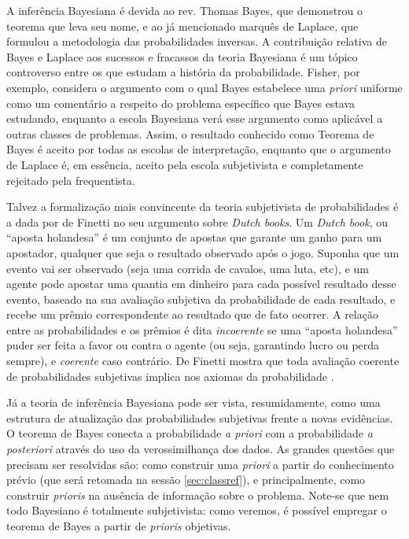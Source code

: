 A inferência Bayesiana é devida ao rev. Thomas Bayes, que demonstrou o teorema que leva seu nome, e ao já mencionado marquês de
Laplace, que formulou a metodologia das probabilidades inversas. A contribuição relativa de Bayes e Laplace aos sucessos
e fracassos da teoria Bayesiana é um tópico controverso	entre os que estudam a história da probabilidade\citep{Zabell09}.
Fisher, por exemplo, considera o argumento com o qual Bayes estabelece uma {\em priori} uniforme como um comentário
a respeito do problema específico que Bayes estava estudando, enquanto a escola Bayesiana verá esse argumento
como aplicável a outras classes de problemas\citep{Aldrich08}. Assim, o resultado conhecido como Teorema de Bayes é aceito
por todas as escolas de interpretação, enquanto que o argumento de Laplace 
é, em essência, aceito pela escola subjetivista e completamente rejeitado pela frequentista. 

Talvez a formalização mais convincente da teoria subjetivista de probabilidades é a dada por de Finetti no seu argumento sobre
{\em Dutch books}. Um {\em Dutch book}, ou ``aposta holandesa'' 
é um conjunto de apostas que garante um ganho para um apostador, qualquer que seja o
resultado observado após o jogo. Suponha que um evento vai ser observado (seja uma corrida de cavalos, uma luta, etc), e um
agente pode apostar uma quantia em dinheiro para cada possível resultado desse evento, baseado na sua avaliação subjetiva da
probabilidade de cada resultado, e recebe um prêmio correspondente ao resultado que de fato ocorrer. A relação entre as 
probabilidades e os prêmios é dita {\em incoerente} se uma ``aposta holandesa'' puder ser feita a favor ou contra o agente
(ou seja, garantindo lucro ou perda sempre), e {\em coerente} caso contrário. De Finetti mostra que toda avaliação 
coerente de probabilidades subjetivas implica nos axiomas da probabilidade \citep{deFinetti37}.

Já a teoria de inferência Bayesiana pode ser vista, resumidamente, como uma estrutura de atualização das probabilidades subjetivas
frente a novas evidências. O teorema de Bayes conecta a probabilidade {\em a priori} com a probabilidade {\em a posteriori}
através do uso da verossimilhança dos dados. As grandes questões que precisam ser resolvidas são: como construir uma {\em priori}
a partir do conhecimento prévio (que será retomada na sessão \ref{sec:classref}), e principalmente, como construir {\em prioris}
na ausência de informação sobre o problema.
Note-se que nem todo Bayesiano é totalmente subjetivista: como veremos, é possível empregar o teorema de Bayes a partir de
{\em prioris} objetivas.

